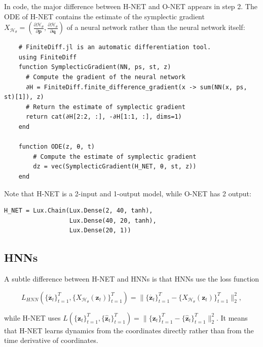 \documentclass[
	parskip, 			   %
	twoside, 			   %
	DIV=14, 			   %
	BCOR=15.0mm, 		   %
	headsepline, 		   %
	open=right, 		   %
	captions=tableheading, %
	bibliography=totoc,    %
	numbers=noenddot       %
]{scrreprt}
\begin{document}
In code, the major difference between H-NET and O-NET appears in step 2. The ODE of H-NET contains the estimate of the symplectic gradient $X_{\mathcal{H}_{\theta}}=(\frac{\partial \mathcal{H}_{\theta}}{\partial \mathbf{p}}, \frac{\partial \mathcal{H}_{\theta}}{\partial \mathbf{q}})$ of a neural network rather than the neural network itself:

\begin{verbatim}
    # FiniteDiff.jl is an automatic differentiation tool.
    using FiniteDiff
    function SymplecticGradient(NN, ps, st, z) 
      # Compute the gradient of the neural network
      ∂H = FiniteDiff.finite_difference_gradient(x -> sum(NN(x, ps, st)[1]), z)
      # Return the estimate of symplectic gradient
      return cat(∂H[2:2, :], -∂H[1:1, :], dims=1)
    end

    function ODE(z, θ, t)
        # Compute the estimate of symplectic gradient
        dz = vec(SymplecticGradient(H_NET, θ, st, z))
    end
\end{verbatim}

Note that H-NET is a 2-input and 1-output model, while O-NET has 2 output:

\begin{verbatim}
H_NET = Lux.Chain(Lux.Dense(2, 40, tanh),
                  Lux.Dense(40, 20, tanh),
                  Lux.Dense(20, 1))
\end{verbatim}

\subsection{HNNs}
A subtle difference between H-NET and HNNs is that HNNs use the loss function 

\begin{equation}
    \label{eq:loss_HNNs}
    L_{HNN}(\{ \dot{\mathbf{z}_{t}} \}_{t=1}^{T}, \{ X_{\mathcal{H}_{\theta}}(\mathbf{z}_{t}) \}_{t=1}^{T}) = \lVert \{ \dot{\mathbf{z}_{t}} \}_{t=1}^{T} - \{ X_{\mathcal{H}_{\theta}}(\mathbf{z}_{t}) \}_{t=1}^{T} \rVert_{2}^{2},
\end{equation}

while H-NET uses $ L(\{ \mathbf{z}_{t} \}_{t=1}^{T}, \{ \mathbf{\hat{z}}_{t} \}_{t=1}^{T}) = \lVert \{ \mathbf{z}_{t} \}_{t=1}^{T} - \{ \mathbf{\hat{z}}_{t} \}_{t=1}^{T} \rVert_{2}^{2} $. It means that H-NET learns dynamics from the coordinates directly rather than from the time derivative of coordinates.
\end{document}
